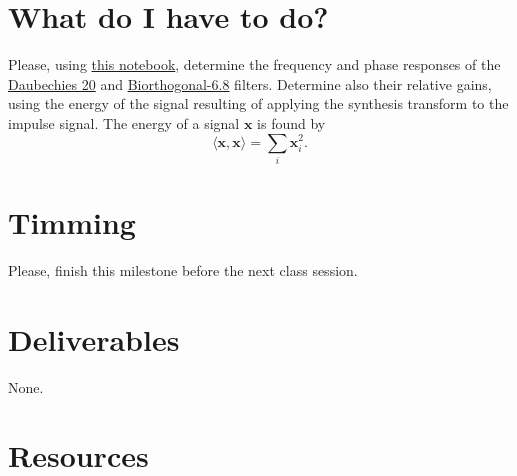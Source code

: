 \section{What do I have to do?}

Please, using
\href{https://github.com/Sistemas-Multimedia/Sistemas-Multimedia.github.io/blob/master/milestones/07-DWT/dwt_filters_analysis.ipynb}{this
  notebook}, determine the frequency and phase responses of the
\href{http://wavelets.pybytes.com/wavelet/db20/}{Daubechies 20} and
\href{http://wavelets.pybytes.com/wavelet/bior6.8/}{Biorthogonal-6.8}
filters. Determine also their relative gains, using the energy of the
signal resulting of applying the synthesis transform to the impulse
signal. The energy of a signal ${\mathbf x}$ is found by
\begin{equation}
  \langle {\mathbf x}, {\mathbf x}\rangle =  \sum_{i}{{\mathbf x}_i^2}.
\end{equation}

\section{Timming}

Please, finish this milestone before the next class session.

\section{Deliverables}

None.

\section{Resources}

\renewcommand{\addcontentsline}[3]{}%


